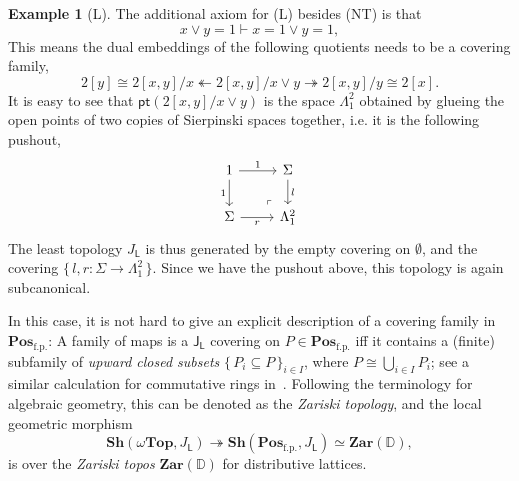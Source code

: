 \documentclass[12pt]{amsart}
\theoremstyle{definition}
\newtheorem{example}[theorem]{Example}
\newcommand{\mb}[1]{\mathbf{#1}}
\newcommand{\mbb}[1]{\mathbb{#1}}
\newcommand{\mr}[1]{\mathrm{#1}}
\newcommand{\ms}[1]{\mathsf{#1}}
\newcommand{\Pos}{\mb{Pos}}
\newcommand{\sh}{\mb{Sh}}
\newcommand{\set}[1]{\{\,#1\,\}}
\newcommand{\surj}{\twoheadrightarrow}
\newcommand{\fp}{_{\mr{f.p.}}}
\newcommand{\emp}{\emptyset}
\newcommand{\pt}{\ms{pt}}
\newcommand{\wTop}{\omega\mb{Top}}
\begin{document}
\begin{example}[L]
  The additional axiom for (L) besides (NT) is that 
  \[ x \vee y = 1 \vdash x = 1 \vee y = 1, \] 
  This means the dual embeddings of the following quotients needs to be a covering family,
  \[ 2[y] \cong 2[x,y]/x \twoheadleftarrow 2[x,y]/x\vee y \surj 2[x,y]/y \cong 2[x]. \]
  It is easy to see that $\pt(2[x,y]/x \vee y)$ is the space $\Lambda^2_1$ obtained by glueing the open points of two copies of Sierpinski spaces together, i.e. it is the following pushout,
  \[
  \begin{tikzcd}
    1 \ar[d, "1"'] \ar[r, "1"] & \Sigma \ar[d, "l"] \\ 
    \Sigma \ar[r, "r"'] & \Lambda^2_1
    \arrow["\lrcorner"{anchor=center, pos=0.125, rotate=180}, draw=none, from=2-2, to=1-1]    
  \end{tikzcd}
  \]
  The least topology $J_{\ms L}$ is thus generated by the empty covering on $\emp$, and the covering $\set{l,r : \Sigma \to \Lambda^2_1}$. Since we have the pushout above, this topology is again subcanonical. 
  
  In this case, it is not hard to give an explicit description of a covering family in $\Pos\fp$: A family of maps is a $\ms J_{\ms L}$ covering on $P \in \Pos\fp$ iff it contains a (finite) subfamily of \emph{upward closed subsets} $\set{P_i\subseteq P}_{i\in I}$, where $P \cong \bigcup_{i\in I}P_i$; see a similar calculation for commutative rings in~\cite[VIII. 6]{maclane2012sheaves}. Following the terminology for algebraic geometry, this can be denoted as the \emph{Zariski topology}, and the local geometric morphism
  \[ \sh(\wTop,J_{\ms L}) \surj \sh(\Pos\fp,J_{\ms L}) \simeq \mb{Zar}(\mbb D), \]
  is over the \emph{Zariski topos} $\mb{Zar}(\mbb D)$ for distributive lattices.
\end{example}
\end{document}
